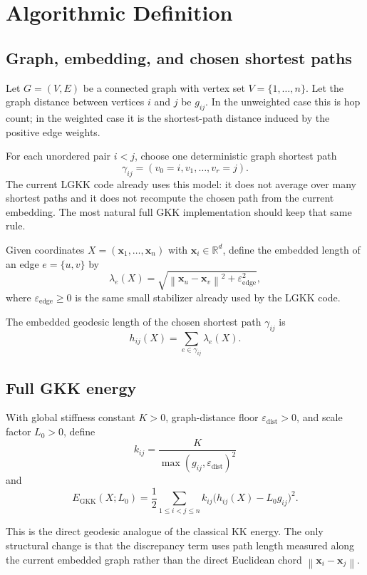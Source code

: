 \documentclass[11pt]{article}
\newcommand{\RR}{\mathbb{R}}
\newcommand{\norm}[1]{\left\lVert #1 \right\rVert}
\newcommand{\vect}[1]{\mathbf{#1}}
\begin{document}
\section{Algorithmic Definition}

\subsection{Graph, embedding, and chosen shortest paths}

Let $G = (V,E)$ be a connected graph with vertex set
$V = \{1,\dots,n\}$. Let the graph distance between vertices $i$ and $j$ be
$g_{ij}$. In the unweighted case this is hop count; in the weighted case it is
the shortest-path distance induced by the positive edge weights.

For each unordered pair $i < j$, choose one deterministic graph shortest path
\[
\gamma_{ij} = (v_0 = i, v_1, \dots, v_r = j).
\]
The current LGKK code already uses this model: it does not average over many
shortest paths and it does not recompute the chosen path from the current
embedding. The most natural full GKK implementation should keep that same rule.

Given coordinates
$X = (\vect{x}_1,\dots,\vect{x}_n)$ with $\vect{x}_i \in \RR^d$,
define the embedded length of an edge $e = \{u,v\}$ by
\[
\lambda_e(X) = \sqrt{\norm{\vect{x}_u - \vect{x}_v}^2 + \varepsilon_{\mathrm{edge}}^2},
\]
where $\varepsilon_{\mathrm{edge}} \ge 0$ is the same small stabilizer already
used by the LGKK code.

The embedded geodesic length of the chosen shortest path $\gamma_{ij}$ is
\[
h_{ij}(X) = \sum_{e \in \gamma_{ij}} \lambda_e(X).
\]

\subsection{Full GKK energy}

With global stiffness constant $K > 0$, graph-distance floor
$\varepsilon_{\mathrm{dist}} > 0$, and scale factor $L_0 > 0$, define
\[
k_{ij} = \frac{K}{\max(g_{ij}, \varepsilon_{\mathrm{dist}})^2}
\]
and
\[
E_{\mathrm{GKK}}(X;L_0)
=
\frac{1}{2}
\sum_{1 \le i < j \le n}
k_{ij}\bigl(h_{ij}(X) - L_0 g_{ij}\bigr)^2.
\]

This is the direct geodesic analogue of the classical KK energy. The only
structural change is that the discrepancy term uses path length measured along
the current embedded graph rather than the direct Euclidean chord
$\norm{\vect{x}_i-\vect{x}_j}$.
\end{document}
